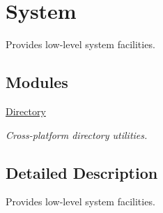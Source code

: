\hypertarget{group___fa_system}{\section{System}
\label{group___fa_system}
}


Provides low-\/level system facilities.  


\subsection*{Modules}
\begin{DoxyCompactItemize}
\item 
\hyperlink{group___fa_system_directory}{Directory}
\begin{DoxyCompactList}\small\item\em Cross-\/platform directory utilities. \end{DoxyCompactList}\end{DoxyCompactItemize}


\subsection{Detailed Description}
Provides low-\/level system facilities. 